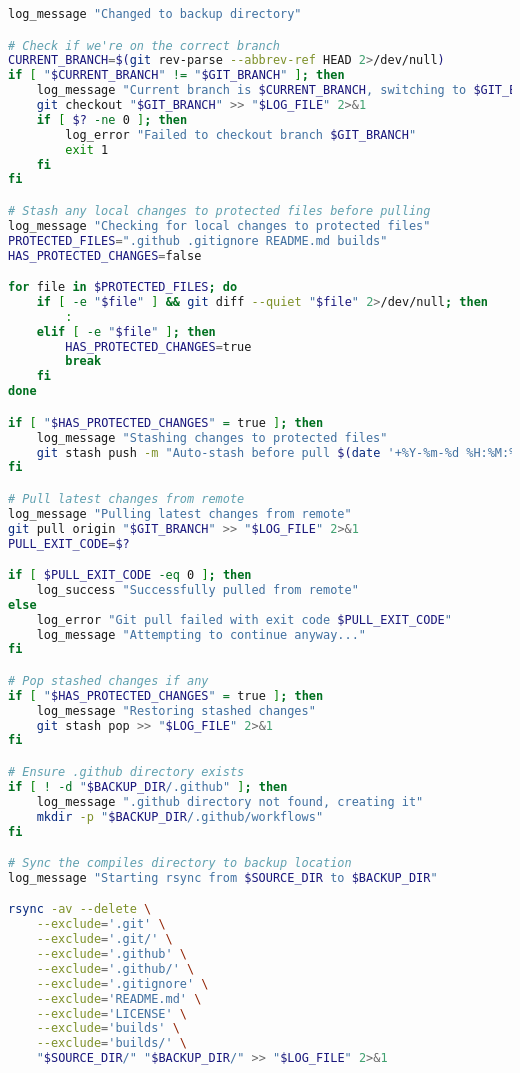 \begin{lstlisting}[language=bash]
log_message "Changed to backup directory"

# Check if we're on the correct branch
CURRENT_BRANCH=$(git rev-parse --abbrev-ref HEAD 2>/dev/null)
if [ "$CURRENT_BRANCH" != "$GIT_BRANCH" ]; then
    log_message "Current branch is $CURRENT_BRANCH, switching to $GIT_BRANCH"
    git checkout "$GIT_BRANCH" >> "$LOG_FILE" 2>&1
    if [ $? -ne 0 ]; then
        log_error "Failed to checkout branch $GIT_BRANCH"
        exit 1
    fi
fi

# Stash any local changes to protected files before pulling
log_message "Checking for local changes to protected files"
PROTECTED_FILES=".github .gitignore README.md builds"
HAS_PROTECTED_CHANGES=false

for file in $PROTECTED_FILES; do
    if [ -e "$file" ] && git diff --quiet "$file" 2>/dev/null; then
        :
    elif [ -e "$file" ]; then
        HAS_PROTECTED_CHANGES=true
        break
    fi
done

if [ "$HAS_PROTECTED_CHANGES" = true ]; then
    log_message "Stashing changes to protected files"
    git stash push -m "Auto-stash before pull $(date '+%Y-%m-%d %H:%M:%S')" $PROTECTED_FILES >> "$LOG_FILE" 2>&1
fi

# Pull latest changes from remote
log_message "Pulling latest changes from remote"
git pull origin "$GIT_BRANCH" >> "$LOG_FILE" 2>&1
PULL_EXIT_CODE=$?

if [ $PULL_EXIT_CODE -eq 0 ]; then
    log_success "Successfully pulled from remote"
else
    log_error "Git pull failed with exit code $PULL_EXIT_CODE"
    log_message "Attempting to continue anyway..."
fi

# Pop stashed changes if any
if [ "$HAS_PROTECTED_CHANGES" = true ]; then
    log_message "Restoring stashed changes"
    git stash pop >> "$LOG_FILE" 2>&1
fi

# Ensure .github directory exists
if [ ! -d "$BACKUP_DIR/.github" ]; then
    log_message ".github directory not found, creating it"
    mkdir -p "$BACKUP_DIR/.github/workflows"
fi

# Sync the compiles directory to backup location
log_message "Starting rsync from $SOURCE_DIR to $BACKUP_DIR"

rsync -av --delete \
    --exclude='.git' \
    --exclude='.git/' \
    --exclude='.github' \
    --exclude='.github/' \
    --exclude='.gitignore' \
    --exclude='README.md' \
    --exclude='LICENSE' \
    --exclude='builds' \
    --exclude='builds/' \
    "$SOURCE_DIR/" "$BACKUP_DIR/" >> "$LOG_FILE" 2>&1


\end{lstlisting}

